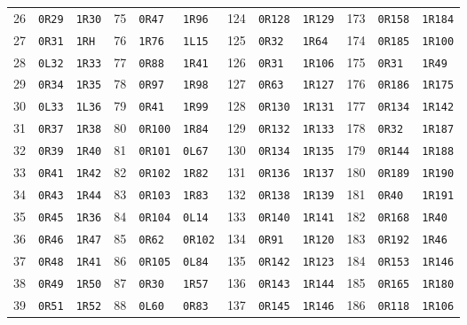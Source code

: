 \begin{center}
\begin{tabular}{@{}rll@{\quad}rll@{\quad}rll@{\quad}rll@{}}
26 & \texttt{0R29} & \texttt{1R30} & 75 & \texttt{0R47} & \texttt{1R96} & 124 & \texttt{0R128} & \texttt{1R129} & 173 & \texttt{0R158} & \texttt{1R184}\\
27 & \texttt{0R31} & \texttt{1RH} & 76 & \texttt{1R76} & \texttt{1L15} & 125 & \texttt{0R32} & \texttt{1R64} & 174 & \texttt{0R185} & \texttt{1R100}\\
28 & \texttt{0L32} & \texttt{1R33} & 77 & \texttt{0R88} & \texttt{1R41} & 126 & \texttt{0R31} & \texttt{1R106} & 175 & \texttt{0R31} & \texttt{1R49}\\
29 & \texttt{0R34} & \texttt{1R35} & 78 & \texttt{0R97} & \texttt{1R98} & 127 & \texttt{0R63} & \texttt{1R127} & 176 & \texttt{0R186} & \texttt{1R175}\\
30 & \texttt{0L33} & \texttt{1L36} & 79 & \texttt{0R41} & \texttt{1R99} & 128 & \texttt{0R130} & \texttt{1R131} & 177 & \texttt{0R134} & \texttt{1R142}\\
31 & \texttt{0R37} & \texttt{1R38} & 80 & \texttt{0R100} & \texttt{1R84} & 129 & \texttt{0R132} & \texttt{1R133} & 178 & \texttt{0R32} & \texttt{1R187}\\
32 & \texttt{0R39} & \texttt{1R40} & 81 & \texttt{0R101} & \texttt{0L67} & 130 & \texttt{0R134} & \texttt{1R135} & 179 & \texttt{0R144} & \texttt{1R188}\\
33 & \texttt{0R41} & \texttt{1R42} & 82 & \texttt{0R102} & \texttt{1R82} & 131 & \texttt{0R136} & \texttt{1R137} & 180 & \texttt{0R189} & \texttt{1R190}\\
34 & \texttt{0R43} & \texttt{1R44} & 83 & \texttt{0R103} & \texttt{1R83} & 132 & \texttt{0R138} & \texttt{1R139} & 181 & \texttt{0R40} & \texttt{1R191}\\
35 & \texttt{0R45} & \texttt{1R36} & 84 & \texttt{0R104} & \texttt{0L14} & 133 & \texttt{0R140} & \texttt{1R141} & 182 & \texttt{0R168} & \texttt{1R40}\\
36 & \texttt{0R46} & \texttt{1R47} & 85 & \texttt{0R62} & \texttt{0R102} & 134 & \texttt{0R91} & \texttt{1R120} & 183 & \texttt{0R192} & \texttt{1R46}\\
37 & \texttt{0R48} & \texttt{1R41} & 86 & \texttt{0R105} & \texttt{0L84} & 135 & \texttt{0R142} & \texttt{1R123} & 184 & \texttt{0R153} & \texttt{1R146}\\
38 & \texttt{0R49} & \texttt{1R50} & 87 & \texttt{0R30} & \texttt{1R57} & 136 & \texttt{0R143} & \texttt{1R144} & 185 & \texttt{0R165} & \texttt{1R180}\\
39 & \texttt{0R51} & \texttt{1R52} & 88 & \texttt{0L60} & \texttt{0R83} & 137 & \texttt{0R145} & \texttt{1R146} & 186 & \texttt{0R118} & \texttt{1R106}\\

\end{tabular}
\end{center}

